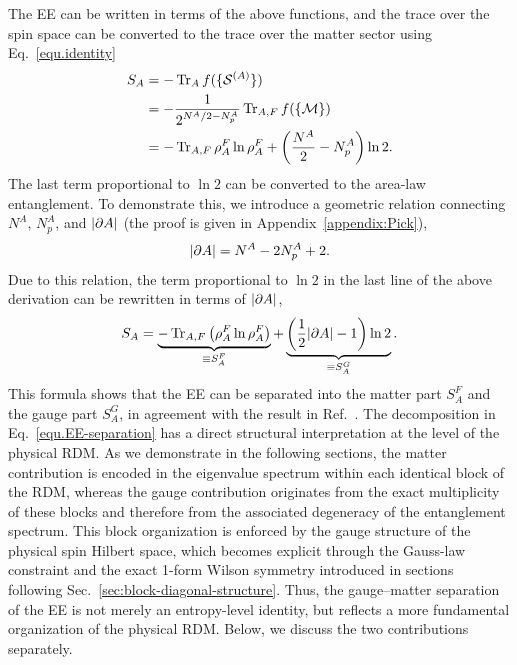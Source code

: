 The EE can be written in terms of the above functions, and the trace over the spin space can be converted to the trace over the matter sector using Eq.~\eqref{equ.identity}
\begin{align*}
    S_A &= -\Tr_A f(\{\mathcal{S}^{(A)}\}) \\
    &= -\frac{1}{2^{N^A/2 - N^A_p}}\Tr_{A,F} f(\left\{ \mathcal{M} \right\}) \\
    &= -\Tr_{A,F} \rho^F_A\ln\rho^F_A + \left( \frac{N^A}{2}-N^A_p \right)\ln 2.
\end{align*}
{The last term proportional to $\ln 2$ can be converted to the area-law entanglement.} To demonstrate this, we introduce a geometric relation connecting $N^A$, $N^A_p$, and $\abs{\partial A}$ (the proof is given in Appendix~\ref{appendix:Pick}),
\begin{equation}\label{equ.Pick_sim-con}
    \abs{\partial A} = N^A - 2N^A_p + 2.
\end{equation}
Due to this relation, the term proportional to $\ln 2$ in the last line of the above derivation can be rewritten in terms of $\abs{\partial A}$, 
\begin{equation}\label{equ.EE-separation}
    S_A = \underbrace{-\Tr_{A,F}\left( \rho_A^F\ln\rho_A^F \right)}_{\equiv S_A^F} + \underbrace{\left( \frac{1}{2}\abs{\partial A}-1 \right)\ln 2}_{\equiv S_A^G}.
\end{equation}
This formula shows that the EE can be separated into the matter part $S^F_A$ and the gauge part $S^G_A$, in agreement with the result in Ref.~\cite{Yao-Qi_2010}. 
%
{
The decomposition in Eq.~\eqref{equ.EE-separation} has a direct structural interpretation at the level of the physical RDM. 
%
As we demonstrate in the following sections, the matter contribution is encoded in the eigenvalue spectrum within each identical block of the RDM, whereas the gauge contribution originates from the exact multiplicity of these blocks and therefore from the associated degeneracy of the entanglement spectrum.
%
This block organization is enforced by the gauge structure of the physical spin Hilbert space, which becomes explicit through the Gauss-law constraint and the exact 1-form Wilson symmetry introduced in sections following Sec.~\ref{sec:block-diagonal-structure}.   
%
Thus, the gauge--matter separation of the EE is not merely an entropy-level identity, but reflects a more fundamental organization of the physical RDM.
%
Below, we discuss the two contributions separately.
}
%



